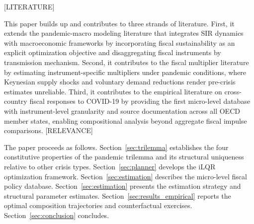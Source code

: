\documentclass[12pt, a4paper]{article}
\begin{document}



[LITERATURE]

This paper builds up and contributes to three strands of literature. First, it extends the pandemic-macro modeling literature that integrates SIR dynamics with macroeconomic frameworks \citet{Atkeson2020, eichenbaum2021macro, alvarez2021, KaplanMollViolante2020, Jones2021, acemoglu2021} by incorporating fiscal sustainability as an explicit optimization objective and disaggregating fiscal instruments by transmission mechanism. Second, it contributes to the fiscal multiplier literature \citet{blanchard2002, ramey2018, romer2010} by estimating instrument-specific multipliers under pandemic conditions, where Keynesian supply shocks \citet{guerrieri2022} and voluntary demand reductions \citet{GOOLSBEE2021} render pre-crisis estimates unreliable. Third, it contributes to the empirical literature on cross-country fiscal responses to COVID-19 \citet{deb2021,chetty2020, Autor2022} by providing the first micro-level database with instrument-level granularity and source documentation across all OECD member states, enabling compositional analysis beyond aggregate fiscal impulse comparisons.
[RELEVANCE]


The paper proceeds as follows. Section~\ref{sec:trilemma} establishes the four
constitutive properties of the pandemic trilemma and its structural uniqueness relative
to other crisis types. Section~\ref{sec:planner} develops the iLQR optimization
framework. Section~\ref{sec:estimation} describes the micro-level fiscal policy database.
Section~\ref{sec:estimation} presents the estimation strategy and structural parameter
estimates. Section~\ref{sec:results_empirical} reports the optimal composition trajectories and
counterfactual exercises. Section~\ref{sec:conclusion} concludes.
\end{document}
